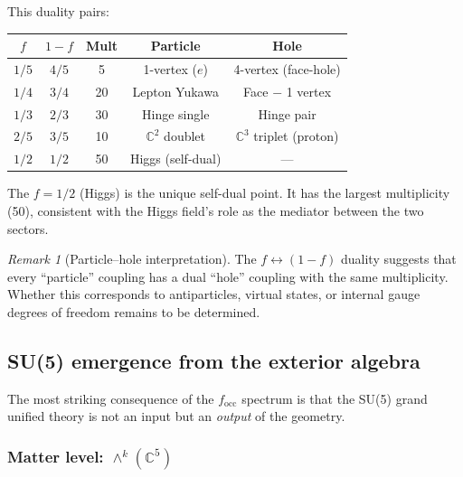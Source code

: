 \documentclass[12pt]{article}
\theoremstyle{remark}
\newtheorem{remark}[theorem]{Remark}
\theoremstyle{definition}
\newcommand{\CC}{\mathbb{C}}
\begin{document}
This duality pairs:
\begin{center}
\begin{tabular}{ccccc}
\hline
$f$ & $1-f$ & Mult & Particle & Hole \\
\hline
$1/5$ & $4/5$ & 5 & 1-vertex ($e$) & 4-vertex (face-hole) \\
$1/4$ & $3/4$ & 20 & Lepton Yukawa & Face $-$ 1 vertex \\
$1/3$ & $2/3$ & 30 & Hinge single & Hinge pair \\
$2/5$ & $3/5$ & 10 & $\CC^2$ doublet & $\CC^3$ triplet (proton) \\
$1/2$ & $1/2$ & 50 & Higgs (self-dual) & --- \\
\hline
\end{tabular}
\end{center}

The $f = 1/2$ (Higgs) is the unique self-dual point.  It has the largest multiplicity (50), consistent with the Higgs field's role as the mediator between the two sectors.

\begin{remark}[Particle--hole interpretation]
The $f \leftrightarrow (1-f)$ duality suggests that every ``particle'' coupling has a dual ``hole'' coupling with the same multiplicity.  Whether this corresponds to antiparticles, virtual states, or internal gauge degrees of freedom remains to be determined.
\end{remark}

\subsection{SU(5) emergence from the exterior algebra}
\label{sec:su5_emergence}

The most striking consequence of the $f_\mathrm{occ}$ spectrum is that the SU(5) grand unified theory is not an input but an \emph{output} of the geometry.

\subsubsection{Matter level: $\wedge^k(\CC^5)$}
\end{document}

